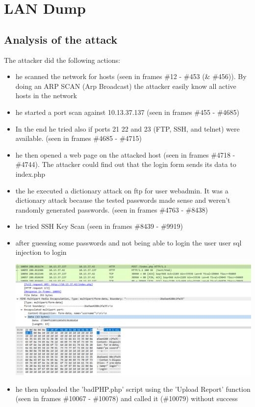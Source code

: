 \section{LAN Dump}
\subsection{Analysis of the attack}
The attacker did the following actions:
\begin{itemize}
    \item he scanned the network for hosts (seen in frames \#12 - \#453 (\& \#456)). By doing an ARP SCAN (Arp Broadcast) the attacker easily know all active hosts in the network 
    \item he started a port scan against 10.13.37.137 (seen in frames \#455 - \#4685)
    \item In the end he tried also if ports 21 22 and 23 (FTP, SSH, and telnet) were available. (seen in frames \#4685 - \#4715)
    \item he then opened a web page on the attacked host (seen in frames \#4718 - \#4744). The attacker could find out that the login form sends its data to index.php
    \item the he executed a dictionary attack on ftp for user webadmin. It was a dictionary attack because the tested passwords made sense and weren't randomly generated passwords. (seen in frames \#4763 - \#8438)
    \item he tried SSH Key Scan (seen in frames \#8439 - \#9919)
    \item after guessing some passwords and not being able to login the user user sql injection to login 
    \begin{center}
        \includegraphics{imgs/sqlinjecton.PNG}
    \end{center}
    \item he then uploaded the 'badPHP.php' script using the 'Upload Report' function (seen in frames \#10067 - \#10078) and called it (\#10079) without success

\end{itemize}
